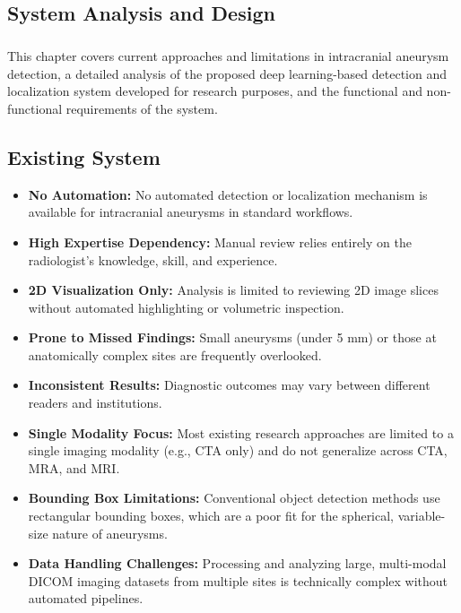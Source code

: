 \documentclass[twoside,a4paper,openright]{report} %
\begin{document}
\begin{flushleft}
\chapter{System Analysis and Design}
\end{flushleft}

\paragraph{}
\hspace{1.5cm}
This chapter covers current approaches and limitations in intracranial aneurysm detection, a detailed analysis of the proposed deep learning-based detection and localization system developed for research purposes, and the functional and non-functional requirements of the system.

\section{Existing System}

\begin{itemize}
    \item \textbf{No Automation:} No automated detection or localization mechanism is available for intracranial aneurysms in standard workflows.
    \item \textbf{High Expertise Dependency:} Manual review relies entirely on the radiologist's knowledge, skill, and experience.
    \item \textbf{2D Visualization Only:} Analysis is limited to reviewing 2D image slices without automated highlighting or volumetric inspection.
    \item \textbf{Prone to Missed Findings:} Small aneurysms (under 5 mm) or those at anatomically complex sites are frequently overlooked.
    \item \textbf{Inconsistent Results:} Diagnostic outcomes may vary between different readers and institutions.
    \item \textbf{Single Modality Focus:} Most existing research approaches are limited to a single imaging modality (e.g., CTA only) and do not generalize across CTA, MRA, and MRI.
    \item \textbf{Bounding Box Limitations:} Conventional object detection methods use rectangular bounding boxes, which are a poor fit for the spherical, variable-size nature of aneurysms.
    \item \textbf{Data Handling Challenges:} Processing and analyzing large, multi-modal DICOM imaging datasets from multiple sites is technically complex without automated pipelines.
\end{itemize}
\end{document}
